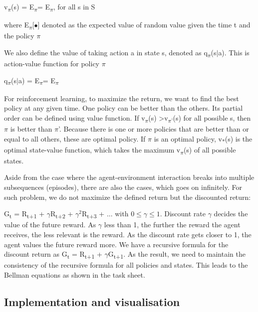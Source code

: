 \documentclass[11pt]{article}
\begin{document}
v\textsubscript{$\pi$}(s) = E\textsubscript{$\pi$}\big[ G\textsubscript{$t$}|S\textsubscript{t}=s \big] = E\textsubscript{$\pi$}\big[ $\sum_{k=0}^{\infty} \gamma^{k} R\textsubscript{t+k+1} | S\textsubscript{t}=s$ \big], for all s in S

where E\textsubscript{$\pi$}[$\bullet$] denoted as the expected value of random value given the time t and the policy $\pi$

We also define the value of taking action a in state s, denoted as q\textsubscript{$\pi$}(s$\vert$a).
This is action-value function for policy $\pi$

q\textsubscript{$\pi$}(s$\vert$a) = E\textsubscript{$\pi$}\big[ G\textsubscript{$t$}|S\textsubscript{t}=s,  A\textsubscript{t}=a \big] = E\textsubscript{$\pi$}\big[ $\sum_{k=0}^{\infty} \gamma^{k} R\textsubscript{t+k+1} | S\textsubscript{t}=s, A\textsubscript{t}=a $ \big]

For reinforcement learning, to maximize the return, we want to find the best policy at any given time. One policy can be better than the others. Its partial order can be defined using value function. If v\textsubscript{$\pi$}(s) >v\textsubscript{$\pi$'}(s) for all possible s, then $\pi$ is better than $\pi$'. Because there is one or more policies that are better than or equal to all others, these are optimal policy. If $\pi$ is an optimal policy, v\textsubscript{*}(s) is the optimal state-value function, which takes the maximum v\textsubscript{$\pi$}(s) of all possible states.

Aside from the case where the agent-environment interaction breaks into multiple subsequences (episodes), there are also the cases, which goes on infinitely. For such problem, we do not maximize the defined return but the discounted return:

G\textsubscript{t} = R\textsubscript{t+1} + $\gamma$R\textsubscript{t+2} + $\gamma^{2}$R\textsubscript{t+3} + ... with $0 \leq \gamma \leq 1$. Discount rate $\gamma$ decides the value of the future reward. As $\gamma$ less than 1, the further the reward the agent receives, the less relevant is the reward. As the discount rate gets closer to 1, the agent values the future reward more. We have a recursive formula for the discount return as G\textsubscript{t} = R\textsubscript{t+1} + $\gamma$G\textsubscript{t+1}. As the result, we need to maintain the consistency of the recursive formula for all policies and states. This leads to the Bellman equations as shown in the task sheet.

\subsection{Implementation and visualisation}
\end{document}
